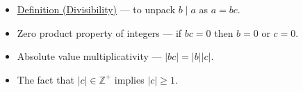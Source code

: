 \begin{remark*}[Dependencies]
\begin{itemize}
  \item \hyperref[def:divisibility]{Definition (Divisibility)} — to unpack $b \mid a$ as $a = bc$.
  \item Zero product property of integers — if $bc = 0$ then $b = 0$ or $c = 0$.
  \item Absolute value multiplicativity — $|bc| = |b||c|$.
  \item The fact that $|c| \in \mathbb{Z}^{+}$ implies $|c| \geq 1$.
\end{itemize}
\end{remark*}